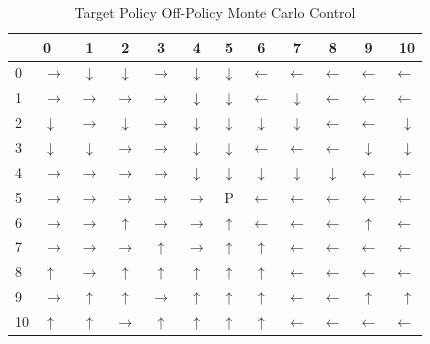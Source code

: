 \documentclass[paper=a4, fontsize=11pt]{scrartcl}
\numberwithin{equation}{section}		%
\numberwithin{figure}{section}			%
\numberwithin{table}{section}				%
\begin{document}
\begin{table}[H]
\caption{Target Policy Off-Policy Monte Carlo Control}
\centering
\begin{tabular}{l|l*{9}{c}r}
  \hline
 & 0 & 1 & 2 & 3 & 4 & 5 & 6 & 7 & 8 & 9 & 10 \\ \hline 
0 & $\rightarrow$&	$\downarrow$&	$\downarrow$&	$\rightarrow$&	$\downarrow$&	$\downarrow$&	$\leftarrow$&	$\leftarrow$&	$\leftarrow$&	$\leftarrow$&	$\leftarrow$\\	
1&$\rightarrow$&	$\rightarrow$&	$\rightarrow$&	$\rightarrow$&	$\downarrow$&	$\downarrow$&	$\leftarrow$&	$\downarrow$&	$\leftarrow$&	$\leftarrow$&	$\leftarrow$	\\
2&$\downarrow$&	$\rightarrow$&	$\downarrow$&	$\rightarrow$&	$\downarrow$&	$\downarrow$&	$\downarrow$&	$\downarrow$&	$\leftarrow$&	$\leftarrow$&	$\downarrow$\\	
3&$\downarrow$	&$\downarrow$&	$\rightarrow$&	$\rightarrow$&	$\downarrow$&	$\downarrow$&	$\leftarrow$&	$\leftarrow$&	$\leftarrow$&	$\downarrow$&	$\downarrow$\\	
4&$\rightarrow$&	$\rightarrow$&	$\rightarrow$&	$\rightarrow$  &	$\downarrow$&	$\downarrow$&	$\downarrow$&	$\downarrow$&	$\downarrow$&	$\leftarrow$&	$\leftarrow$\\	
5&$\rightarrow$  &	$\rightarrow$  &	$\rightarrow$  &	$\rightarrow$ &	$\rightarrow$ &	P&	$\leftarrow$&	$\leftarrow$&	$\leftarrow$&	$\leftarrow$&	$\leftarrow$\\	
6&$\rightarrow$ &	$\rightarrow$ &	$\uparrow$&	$\rightarrow$ &	$\rightarrow$ &	$\uparrow$&	$\leftarrow$&	$\leftarrow$&	$\leftarrow$&	$\uparrow$&	$\leftarrow$\\	
7&$\rightarrow$ &	$\rightarrow$ &	$\rightarrow$ &	$\uparrow$&	$\rightarrow$ &	$\uparrow$&	$\uparrow$&	$\leftarrow$&	$\leftarrow$&	$\leftarrow$&	$\leftarrow$\\	
8&$\uparrow$&	$\rightarrow$ &	$\uparrow$&	$\uparrow$&	$\uparrow$&	$\uparrow$&	$\uparrow$&	$\leftarrow$&	$\leftarrow$&	$\leftarrow$&	$\leftarrow$\\	
9&$\rightarrow$ &	$\uparrow$&	$\uparrow$&	$\rightarrow$ &	$\uparrow$&	$\uparrow$&	$\uparrow$&	$\leftarrow$&	$\leftarrow$&	$\uparrow$&	$\uparrow$\\	
10&$\uparrow$&	$\uparrow$&	$\rightarrow$ &	$\uparrow$&	$\uparrow$&	$\uparrow$&	$\uparrow$&	$\leftarrow$&	$\leftarrow$&	$\leftarrow$&	$\leftarrow$
\end{tabular}
\label{rVIt}
\end{table}
\end{document}
